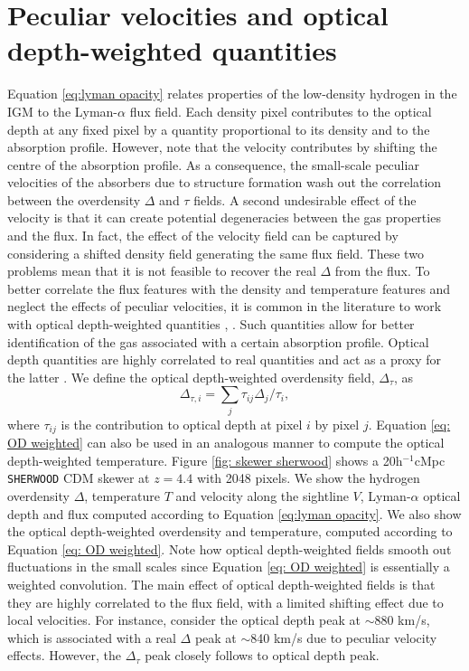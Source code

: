\section{Peculiar velocities and optical depth-weighted quantities}\label{sec: optical depth weighted}
Equation \ref{eq:lyman opacity} relates properties of the low-density hydrogen in the IGM to the Lyman-$\alpha$ flux field. Each density pixel contributes to the optical depth at any fixed pixel by a quantity proportional to its density and to the absorption profile. However, note that the velocity contributes by shifting the centre of the absorption profile. As a consequence, the small-scale peculiar velocities of the absorbers due to structure formation wash out the correlation between the overdensity $\Delta$ and $\tau$ fields. A second undesirable effect of the velocity is that it can create potential degeneracies between the gas properties and the flux. In fact, the effect of the velocity field can be captured by considering a shifted density field generating the same flux field. These two problems mean that it is not feasible to recover the real $\Delta$ from the flux. To better correlate the flux features with the density and temperature features and neglect the effects of peculiar velocities, it is common in the literature to work with optical depth-weighted quantities \cite{_oltinsk__2021}, \cite{Schaye1999}. Such quantities allow for better identification of the gas associated with a certain absorption profile. Optical depth quantities are highly correlated to real quantities and act as a proxy for the latter \cite{Schaye1999}. We define the optical depth-weighted overdensity field, $\Delta_\tau$, as
\begin{equation}\label{eq: OD weighted}
        \Delta_{\tau,i}=\sum_j \tau_{ij} \Delta_j /\tau_i,
\end{equation}
where $\tau_{ij}$ is the contribution to optical depth at pixel $i$ by pixel $j$. Equation \ref{eq: OD weighted} can also be used in an analogous manner to compute the optical depth-weighted temperature. Figure \ref{fig: skewer sherwood} shows a 20h$^{-1}$cMpc \texttt{SHERWOOD} CDM skewer at $z=4.4$ with 2048 pixels. We show the hydrogen overdensity $\Delta$, temperature $T$ and velocity along the sightline $V$, Lyman-$\alpha$ optical depth and flux computed according to Equation \ref{eq:lyman opacity}. We also show the optical depth-weighted overdensity and temperature, computed according to Equation \ref{eq: OD weighted}. Note how optical depth-weighted fields smooth out fluctuations in the small scales since Equation \ref{eq: OD weighted} is essentially a weighted convolution. The main effect of optical depth-weighted fields is that they are highly correlated to the flux field, with a limited shifting effect due to local velocities. For instance, consider the optical depth peak at $\sim$880 km/s, which is associated with a real $\Delta$ peak at $\sim$840 km/s due to peculiar velocity effects. However, the $\Delta_\tau$ peak closely follows to optical depth peak.

